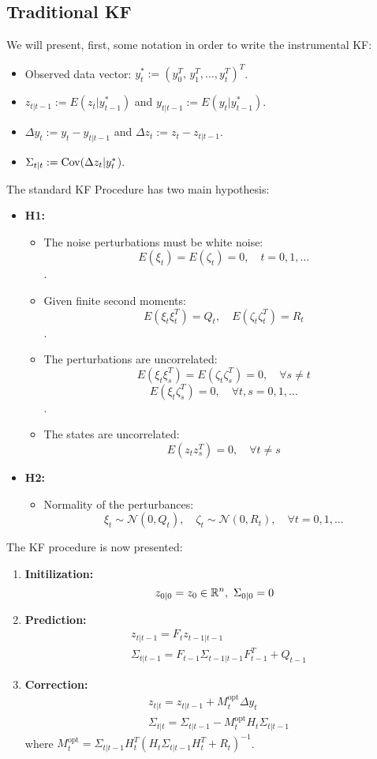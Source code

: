 \subsection{Traditional KF}
We will present, first, some notation in order to write the instrumental KF:
\begin{itemize}
  \item Observed data vector: $y^*_t:=(y_0^T,\,y_1^T,\dots,y_t^T)^T$.
  \item $z_{t|t-1}:=E(z_t|y^*_{t-1})$ and $y_{t|t-1}:=E(y_t|y^*_{t-1})$.
  \item $\Delta y_t:=y_t-y_{t|t-1}$ and $\Delta z_t:=z_t-z_{t|t-1}$.
  \item $\Sigma_{t|t}:={\rm Cov}(\Delta z_t|y_t^*$).
\end{itemize}
The standard KF
Procedure \cite{kalman1960new} has two main hypothesis:\\
\begin{itemize}
  \item \textbf{H1: }\begin{itemize}
    \item The noise perturbations must be white noise: \[E(\xi_t)=E(\zeta_t)=0, \quad t=0,1,\ldots\].
    \item Given finite second moments: \[E(\xi_t\xi_t^T)=Q_t, \quad E(\zeta_t\zeta_t^T)=R_t\].
    \item The perturbations are uncorrelated: \[E(\xi_t\xi_s^T)=E(\zeta_t\zeta_s^T)=0,\quad\forall s\neq t\]\[E(\xi_t\zeta_s^T)=0, \quad \forall t,s=0,1,\ldots\].
    \item The states are uncorrelated:
    \[E(z_tz_s^T)=0,\quad\forall t\neq s\]
  \end{itemize}
  \item \textbf{H2: }
  \begin{itemize}
    \item Normality of the perturbances:
    \[\xi_t\sim\mathcal{N}(0,Q_t),\quad\zeta_t\sim\mathcal{N}(0,R_t),\quad\forall t=0,1,\ldots\]
  \end{itemize}
\end{itemize}
The KF procedure is now presented:
\begin{enumerate}
  \item \textbf{Initilization: }
  \[
  z_{0|0}=z_0\in\R^n, \ \Sigma_{0|0}=0
  \]
  \item \textbf{Prediction: }
  \[
  \begin{split}
    &z_{t|t-1}=F_tz_{t-1|t-1}\\
    &\Sigma_{t|t-1}=F_{t-1}\Sigma_{t-1|t-1}F_{t-1}^T+Q_{t-1}
  \end{split}
  \]
  \item \textbf{Correction: }
  \[
  \begin{split}
    &z_{t | t}=z_{t | t-1}+M_{t}^{\text{opt}} \Delta y_{t} \\
    &\Sigma_{t | t}=\Sigma_{t | t-1}-M_{t}^{\text{opt}} H_{t} \Sigma_{t | t-1}
  \end{split}
  \]
  where ${M_{t}^{\text {opt}}=\Sigma_{t | t-1} H_{t}^{T}\left(H_{t} \Sigma_{t | t-1} H_{t}^{T}+R_{t}\right)^{-1}}$.
\end{enumerate}

